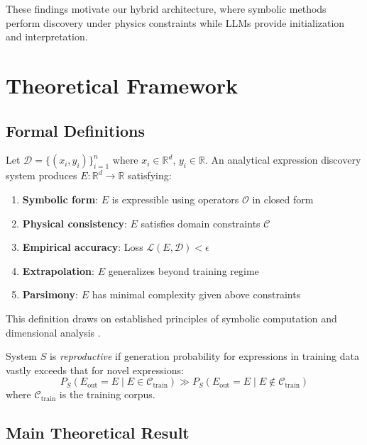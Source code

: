 \documentclass[twoside,11pt]{article}
\newcommand{\R}{\mathbb{R}}
\begin{document}
These findings motivate our hybrid architecture, where symbolic methods perform discovery under physics constraints while LLMs provide initialization and interpretation.

\section{Theoretical Framework}
\label{sec:theory}

\subsection{Formal Definitions}

\begin{definition}
\label{def:analytical_discovery}
Let $\mathcal{D} = \{(x_i, y_i)\}_{i=1}^n$ where $x_i \in \R^d$, $y_i \in \R$. An analytical expression discovery system produces $E: \R^d \to \R$ satisfying:
\begin{enumerate}
\item \textbf{Symbolic form}: $E$ is expressible using operators $\mathcal{O}$ in closed form
\item \textbf{Physical consistency}: $E$ satisfies domain constraints $\mathcal{C}$
\item \textbf{Empirical accuracy}: Loss $\mathcal{L}(E, \mathcal{D}) < \epsilon$
\item \textbf{Extrapolation}: $E$ generalizes beyond training regime
\item \textbf{Parsimony}: $E$ has minimal complexity given above constraints
\end{enumerate}
\end{definition}

This definition draws on established principles of symbolic computation \citep{meurer2017sympy} and dimensional analysis \citep{buckingham1914physically}.

\begin{definition}
\label{def:reproductive}
System $S$ is \emph{reproductive} if generation probability for expressions in training data vastly exceeds that for novel expressions:
\[
P_S(E_{\text{out}} = E \mid E \in \mathcal{C}_{\text{train}}) \gg P_S(E_{\text{out}} = E \mid E \notin \mathcal{C}_{\text{train}})
\]
where $\mathcal{C}_{\text{train}}$ is the training corpus.
\end{definition}

\subsection{Main Theoretical Result}
\end{document}

